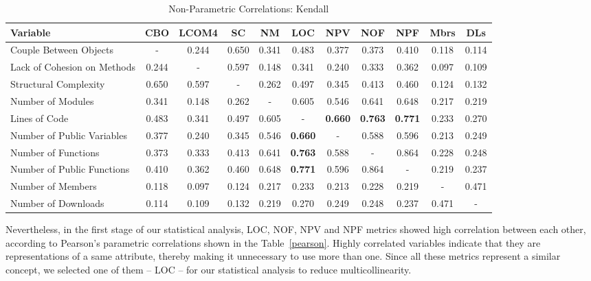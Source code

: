 \documentclass[conference]{IEEEtran}
\begin{document}
\begin{center}
\begin{table}[bt]
\centering \caption{Non-Parametric Correlations: Kendall}
\begin{tabular}{|l|c|c|c|c|c|c|c|c|c|c|} \hline

\textbf{Variable} 	    & CBO & LCOM4 & SC & NM & LOC & NPV & NOF & NPF & Mbrs & DLs
\\ \hline
Couple Between Objects      & - & 0.244 & 0.650 & 0.341 & 0.483 & 0.377 & 0.373 & 0.410 & 0.118 & 0.114
\\ \hline
Lack of Cohesion on Methods & 0.244 & - & 0.597 & 0.148 & 0.341 & 0.240 & 0.333 & 0.362 & 0.097 & 0.109
\\ \hline
Structural Complexity       & 0.650 & 0.597 & - & 0.262 & 0.497 & 0.345 & 0.413 & 0.460 & 0.124 & 0.132
\\ \hline
Number of Modules           & 0.341 & 0.148 & 0.262 & - & 0.605 & 0.546 & 0.641 & 0.648 & 0.217 & 0.219
\\ \hline
Lines of Code               & 0.483 & 0.341 & 0.497 & 0.605 & - & \textbf{0.660} & \textbf{0.763} & \textbf{0.771} & 0.233 & 0.270
\\ \hline
Number of Public Variables  & 0.377 & 0.240 & 0.345 & 0.546 & \textbf{0.660} & - & 0.588 & 0.596 & 0.213 & 0.249
\\ \hline
Number of Functions         & 0.373 & 0.333 & 0.413 & 0.641 & \textbf{0.763} & 0.588 & - & 0.864 & 0.228 & 0.248
\\ \hline
Number of Public Functions  & 0.410 & 0.362 & 0.460 & 0.648 & \textbf{0.771} & 0.596 & 0.864 & - & 0.219 & 0.237
\\ \hline
Number of Members           & 0.118 & 0.097 & 0.124 & 0.217 & 0.233 & 0.213 & 0.228 & 0.219 & - & 0.471
\\ \hline
Number of Downloads         & 0.114 & 0.109 & 0.132 & 0.219 & 0.270 & 0.249 & 0.248 & 0.237 & 0.471 & -
\\ \hline
\end{tabular}
\label{kendall}
\end{table}
\end{center}

Nevertheless, in the first stage of our statistical analysis, LOC, NOF, NPV and NPF metrics 
showed high correlation between each other, according to Pearson's
parametric correlations shown in the Table~\ref{pearson}.
%
Highly correlated variables indicate that they are representations of
a same attribute, thereby making it unnecessary to use more than one.
%
Since all these metrics represent a similar concept, we selected one of them -- LOC -- 
for our statistical analysis to reduce multicollinearity.
\end{document}

